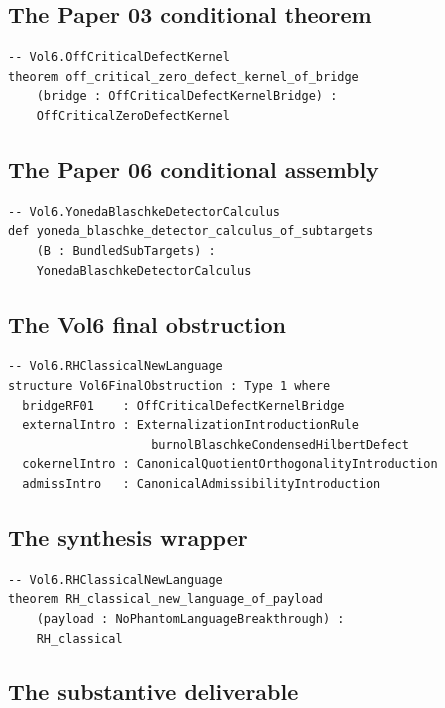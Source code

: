\documentclass[11pt]{article}
\theoremstyle{plain}
\theoremstyle{definition}
\theoremstyle{remark}
\begin{document}
\subsection{The Paper 03 conditional theorem}

\begin{lstlisting}
-- Vol6.OffCriticalDefectKernel
theorem off_critical_zero_defect_kernel_of_bridge
    (bridge : OffCriticalDefectKernelBridge) :
    OffCriticalZeroDefectKernel
\end{lstlisting}

\subsection{The Paper 06 conditional assembly}

\begin{lstlisting}
-- Vol6.YonedaBlaschkeDetectorCalculus
def yoneda_blaschke_detector_calculus_of_subtargets
    (B : BundledSubTargets) :
    YonedaBlaschkeDetectorCalculus
\end{lstlisting}

\subsection{The Vol6 final obstruction}

\begin{lstlisting}
-- Vol6.RHClassicalNewLanguage
structure Vol6FinalObstruction : Type 1 where
  bridgeRF01    : OffCriticalDefectKernelBridge
  externalIntro : ExternalizationIntroductionRule
                    burnolBlaschkeCondensedHilbertDefect
  cokernelIntro : CanonicalQuotientOrthogonalityIntroduction
  admissIntro   : CanonicalAdmissibilityIntroduction
\end{lstlisting}

\subsection{The synthesis wrapper}

\begin{lstlisting}
-- Vol6.RHClassicalNewLanguage
theorem RH_classical_new_language_of_payload
    (payload : NoPhantomLanguageBreakthrough) :
    RH_classical
\end{lstlisting}

\subsection{The substantive deliverable}
\end{document}
